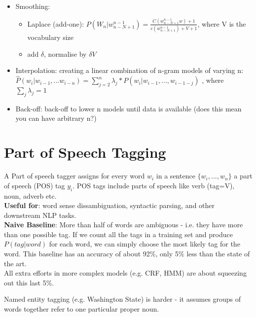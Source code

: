 \documentclass[]{article}
\begin{document}
\begin{itemize}
		\item Smoothing: 
		
			\begin{itemize}
				\item Laplace (add-one): $P(W_n | w_{n - N + 1}^{n-1}) = \frac{C( w_{n - N + 1}^{n-1}w) + 1}{c( w_{n - N + 1}^{n-1}) + V + 1}$, where V is the vocabulary size
				
				\item add $\delta$, normalise by $\delta V$
			
			\end{itemize}
		
	\item Interpolation: creating a linear combination of n-gram models of varying n: $\hat{P}(w_i | w_{i-1},...w_{i-n}) = \sum_{j=2}^{n} \lambda_j * P(w_i | w_{i-1},...,w_{i-1-j})$ , where $\sum_{j}\lambda_j = 1$ 
	
	\item Back-off: back-off to lower n models until data is available (does this mean you can have arbitrary n?)
	
	\end{itemize}
	
	
	
	\clearpage
	\section{Part of Speech Tagging}
	
	A Part of speech tagger assigns for every word $w_i$ in a sentence $\{w_i, ..., w_n\}$ a part of speech (POS) tag $y_i$. POS tags include parts of speech like verb (tag=V), noun, adverb etc. \\
	
	\textbf{Useful for}: word sense dissambiguation, syntactic parsing, and other downstream NLP tasks. \\
	
	\textbf{Naive Baseline}: More than half of words are ambiguous - i.e. they have more than one possible tag. If we count all the tags in a training set and produce $P(tag | word)$ for each word, we can simply choose the most likely tag for the word. This baseline has an accuracy of about 92\%, only 5\% less than the state of the art. \\
	
	All extra efforts in more complex models (e.g. CRF, HMM) are about squeezing out this last 5\%. 
	
	Named entity tagging (e.g. Washington State) is harder - it assumes groups of words together refer to one particular proper noun. 
	
\end{document}

